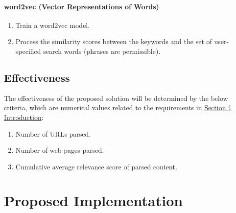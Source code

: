 \documentclass{article}
\begin{document}
\paragraph{word2vec (Vector Representations of Words) \cite{bib-13}}
\begin{enumerate}
	\item Train a word2vec model.
	\item Process the similarity scores between the keywords and the set of user-specified search words (phrases are permissible).
\end{enumerate}

\subsection{Effectiveness}
\label{sec:5.4}
\begin{comment}
(Describe how you will validate the effectiveness of the method.) \\
\end{comment}

The effectiveness of the proposed solution will be determined by the below criteria, which are numerical values related to the requirements in \hyperref[sec:1]{Section 1 Introduction}:
\begin{enumerate}
	\item Number of URLs parsed.
	\item Number of web pages parsed.
	\item Cumulative average relevance score of parsed content.
\end{enumerate}
\newpage

\section{Proposed Implementation}
\label{sec:6}
\begin{comment}
(Implement the method in accordance to \hyperref[sec:5]{Section 5 Proposed Solution} and the validation in accordance to \hyperref[sec:5.4]{Section 5.4 Effectiveness}.)
\end{comment}

\end{document}
